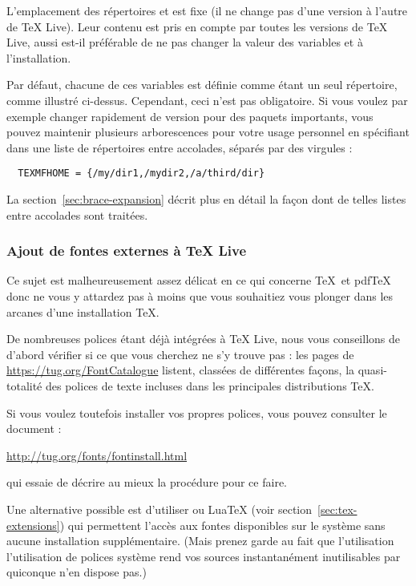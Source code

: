 \documentclass[german, english, french]{article}
\renewcommand{\TL}{\TeX{} Live\xspace}%
\begin{document}
L'emplacement des répertoires  et  est
fixe (il ne change pas d'une version à l'autre de \TL{}). Leur contenu est pris
en compte par toutes les versions de \TL{}, aussi est-il préférable de ne pas
changer la valeur des variables  et 
à l'installation.

Par défaut, chacune de ces variables est définie comme étant un seul répertoire,
comme illustré ci-dessus. Cependant, ceci n'est pas obligatoire.  Si vous voulez
par exemple changer rapidement de version pour des paquets importants, vous
pouvez maintenir plusieurs arborescences pour votre usage personnel en
spécifiant dans  une liste de répertoires entre accolades,
séparés par des virgules :

\begin{verbatim}
  TEXMFHOME = {/my/dir1,/mydir2,/a/third/dir}
\end{verbatim}

La section~\ref{sec:brace-expansion} décrit plus en détail la façon dont de
telles listes entre accolades sont traitées.


\subsubsection{Ajout de fontes externes à \protect\TL{}}

Ce sujet est malheureusement assez délicat en ce qui concerne \TeX\ et pdf\TeX{}
donc ne vous y attardez pas à moins que vous souhaitiez vous plonger dans les
arcanes d'une installation \TeX{}.

De nombreuses polices étant déjà intégrées à \TL, nous vous conseillons de
d'abord vérifier si ce que vous cherchez ne s'y trouve pas : les pages de
\url{https://tug.org/FontCatalogue} listent, classées de différentes façons, la
quasi-totalité des polices de texte incluses dans les principales distributions
\TeX.

Si vous voulez toutefois installer vos propres polices, vous pouvez consulter le
document :

\url{http://tug.org/fonts/fontinstall.html}

qui essaie de décrire au mieux la procédure pour ce faire.

Une alternative possible est d'utiliser \XeTeX{} ou Lua\TeX{} (voir
section~\ref{sec:tex-extensions}) qui permettent l'accès aux fontes disponibles
sur le système sans aucune installation supplémentaire. (Mais prenez garde au
fait que l'utilisation l'utilisation de polices système rend vos sources
instantanément inutilisables par quiconque n'en dispose pas.)
\end{document}
